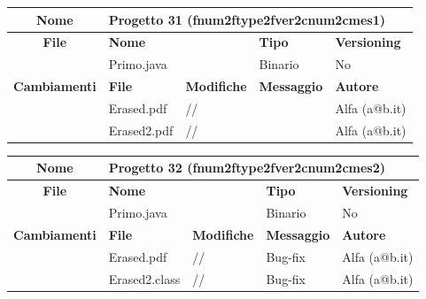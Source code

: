 \begin{table}[ht]
\footnotesize
\begin{tabular}{|c|p{2.5cm}|p{2cm}|p{2.5cm}|p{2.5cm}|}
  \hline
  \textbf{Nome}	& \multicolumn{4}{l|}{Progetto 31 (fnum2ftype2fver2cnum2cmes1)} 									\\
  \hline
  \rowcolor{lightgray}\textbf{File} 		& \multicolumn{2}{l|}{\textbf{Nome}}		& \textbf{Tipo}		& \textbf{Versioning} 		\\
						\cline{2-5}
						& \multicolumn{2}{l|}{Primo.java}		& Binario		& No				\\
  \hline
  \rowcolor{lightgray}\textbf{Cambiamenti}	& \textbf{File}		&\textbf{Modifiche}	& \textbf{Messaggio}	& \textbf{Autore}		\\
						\cline{2-5}
						& Erased.pdf		& //	 		& 			& Alfa (a@b.it)			\\
						\cline{2-5}
						& Erased2.pdf		& //	 		& 			& Alfa (a@b.it)			\\
						
  \hline
\end{tabular}
\end{table}

\begin{table}[ht]
\footnotesize
\begin{tabular}{|c|p{2.5cm}|p{2cm}|p{2.5cm}|p{2.5cm}|}
  \hline
  \textbf{Nome}	& \multicolumn{4}{l|}{Progetto 32 (fnum2ftype2fver2cnum2cmes2)} 									\\
  \hline
  \rowcolor{lightgray}\textbf{File} 		& \multicolumn{2}{l|}{\textbf{Nome}}		& \textbf{Tipo}		& \textbf{Versioning} 		\\
						\cline{2-5}
						& \multicolumn{2}{l|}{Primo.java}		& Binario		& No				\\
  \hline
  \rowcolor{lightgray}\textbf{Cambiamenti}	& \textbf{File}		&\textbf{Modifiche}	& \textbf{Messaggio}	& \textbf{Autore}		\\
						\cline{2-5}
						& Erased.pdf		& //	 		& Bug-fix		& Alfa (a@b.it)			\\
						\cline{2-5}
						& Erased2.class		& //	 		& Bug-fix		& Alfa (a@b.it)			\\
						
  \hline
\end{tabular}
\end{table}




